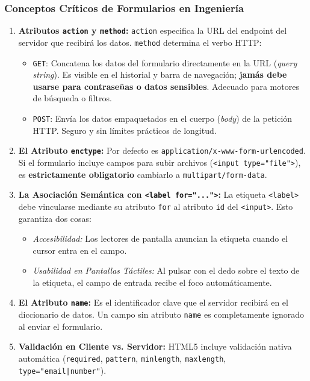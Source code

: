 \subsubsection{Conceptos Críticos de Formularios en Ingeniería}
\begin{enumerate}
  \item \textbf{Atributos \texttt{action} y \texttt{method}:} \texttt{action} especifica la URL del endpoint del servidor que recibirá los datos. \texttt{method} determina el verbo HTTP:
    \begin{itemize}
      \item \texttt{GET}: Concatena los datos del formulario directamente en la URL (\textit{query string}). Es visible en el historial y barra de navegación; \textbf{jamás debe usarse para contraseñas o datos sensibles}. Adecuado para motores de búsqueda o filtros.
      \item \texttt{POST}: Envía los datos empaquetados en el cuerpo (\textit{body}) de la petición HTTP. Seguro y sin límites prácticos de longitud.
    \end{itemize}
  \item \textbf{El Atributo \texttt{enctype}:} Por defecto es \texttt{application/x-www-form-urlencoded}. Si el formulario incluye campos para subir archivos (\texttt{<input type="file">}), es \textbf{estrictamente obligatorio} cambiarlo a \texttt{multipart/form-data}.
  \item \textbf{La Asociación Semántica con \texttt{<label for="...">}:} La etiqueta \texttt{<label>} debe vincularse mediante su atributo \texttt{for} al atributo \texttt{id} del \texttt{<input>}. Esto garantiza dos cosas:
    \begin{itemize}
      \item \textit{Accesibilidad:} Los lectores de pantalla anuncian la etiqueta cuando el cursor entra en el campo.
      \item \textit{Usabilidad en Pantallas Táctiles:} Al pulsar con el dedo sobre el texto de la etiqueta, el campo de entrada recibe el foco automáticamente.
    \end{itemize}
  \item \textbf{El Atributo \texttt{name}:} Es el identificador clave que el servidor recibirá en el diccionario de datos. Un campo sin atributo \texttt{name} es completamente ignorado al enviar el formulario.
  \item \textbf{Validación en Cliente vs. Servidor:}
    HTML5 incluye validación nativa automática (\texttt{required}, \texttt{pattern}, \texttt{minlength}, \texttt{maxlength}, \texttt{type="email|number"}).\\

\end{enumerate}
